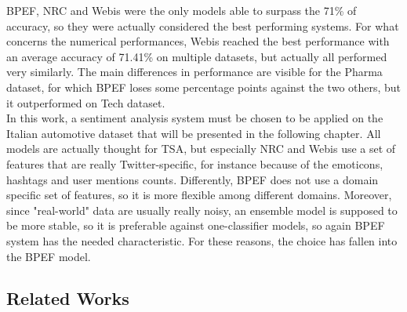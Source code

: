 BPEF, NRC and Webis were the only models able to surpass the 71\% of accuracy, so they were actually considered the best performing systems. For what concerns the numerical performances, Webis reached the best performance with an average accuracy of 71.41\% on multiple datasets, but actually all performed very similarly. The main differences in performance are visible for the Pharma dataset, for which BPEF loses some percentage points against the two others, but it outperformed on Tech dataset.\\
In this work, a sentiment analysis system must be chosen to be applied on the Italian automotive dataset that will be presented in the following chapter. All models are actually thought for \ac{TSA}, but especially NRC and Webis use a set of features that are really Twitter-specific, for instance because of the emoticons, hashtags and user mentions counts. Differently, BPEF does not use a domain specific set of features, so it is more flexible among different domains. Moreover, since "real-world" data are usually really noisy, an ensemble model is supposed to be more stable, so it is preferable against one-classifier models, so again BPEF system has the needed characteristic. For these reasons, the choice has fallen into the BPEF model.









\subsection{Related Works}

